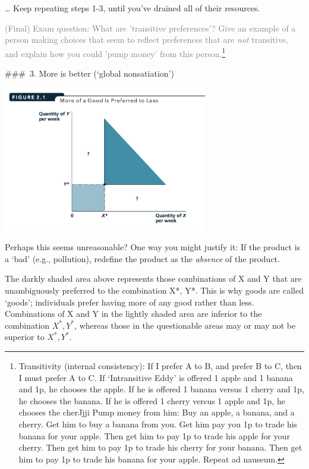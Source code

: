 \documentclass[]{article}
\begin{document}
\ldots{} Keep repeating steps 1-3, until you've drained all of their
resources.

\textcolor{gray}{(Final) Exam question: What are 'transitive preferences'? Give an example of a person making choices that seem to reflect preferences that are \textit{not} transitive, and explain how you could 'pump money' from this person.}\footnote{Transitivity
  (internal consistency): If I prefer A to B, and prefer B to C, then I
  must prefer A to C. If `Intransitive Eddy' is offered 1 apple and 1
  banana and 1p, he chooses the apple. If he is offered 1 banana versus
  1 cherry and 1p, he chooses the banana. If he is offered 1 cherry
  versus 1 apple and 1p, he chooses the cherJjji Pump money from him:
  Buy an apple, a banana, and a cherry. Get him to buy a banana from
  you. Get him pay you 1p to trade his banana for your apple. Then get
  him to pay 1p to trade his apple for your cherry. Then get him to pay
  1p to trade his cherry for your banana. Then get him to pay 1p to
  trade his banana for your apple. Repeat ad nauseum.}

\#\#\#~3. More is better (`global nonsatiation')

\includegraphics[height=2.5in]{picsfigs/moreisbetter.png}

Perhaps this seems unreasonable? One way you might justify it: If the
product is a `bad' (e.g., pollution), redefine the product as the
\emph{absence} of the product.

The darkly shaded area above represents those combinations of X and Y
that are unambiguously preferred to the combination X*, Y*. This is why
goods are called `goods'; individuals prefer having more of any good
rather than less. Combinations of X and Y in the lightly shaded area are
inferior to the combination \(X^{\ast}, Y^{\ast}\), whereas those in the
questionable areas may or may not be superior to \(X^{\ast}, Y^{\ast}\).
\end{document}
